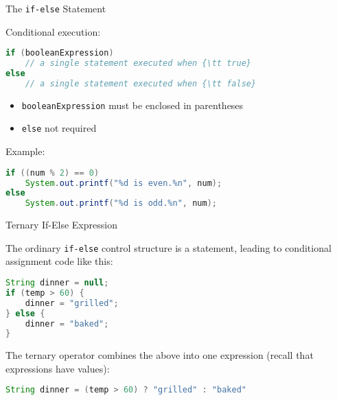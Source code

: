 \documentclass{beamer}
\begin{document}
\begin{frame}[fragile]{The {\tt if-else} Statement}


Conditional execution:
\begin{lstlisting}[language=Java]
if (booleanExpression)
    // a single statement executed when {\tt true}
else
    // a single statement executed when {\tt false}
\end{lstlisting}
\vspace{-.1in}
\begin{itemize}
\item {\tt booleanExpression} must be enclosed in parentheses
\item {\tt else} not required
\end{itemize}
\vspace{-.1in}
Example:
\begin{lstlisting}[language=Java]
if ((num % 2) == 0)
    System.out.printf("%d is even.%n", num);
else
    System.out.printf("%d is odd.%n", num);
\end{lstlisting}

\end{frame}

\begin{frame}[fragile]{Ternary If-Else Expression}


The ordinary {\tt if-else} control structure is a statement, leading
to conditional assignment code like this: 
\begin{lstlisting}[language=Java]
String dinner = null;
if (temp > 60) {
    dinner = "grilled";
} else {
    dinner = "baked";
}
\end{lstlisting}

The ternary operator combines the above into one expression (recall
that expressions have values):

\begin{lstlisting}[language=Java]
String dinner = (temp > 60) ? "grilled" : "baked" 
\end{lstlisting}

\end{frame}
\end{document}
